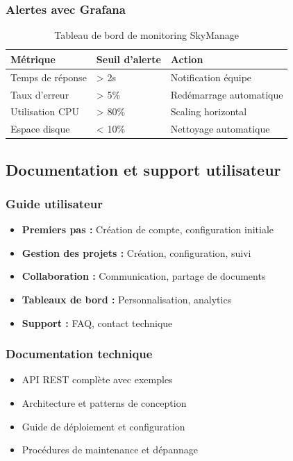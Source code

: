 \subsubsection{Alertes avec Grafana}
\begin{table}[h!]
\centering
\caption{Tableau de bord de monitoring SkyManage}
\label{tab:monitoring}
\begin{tabular}{|l|p{4cm}|p{4cm}|}
\hline
\textbf{Métrique} & \textbf{Seuil d'alerte} & \textbf{Action} \\
\hline
Temps de réponse & > 2s & Notification équipe \\
\hline
Taux d'erreur & > 5\% & Redémarrage automatique \\
\hline
Utilisation CPU & > 80\% & Scaling horizontal \\
\hline
Espace disque & < 10\% & Nettoyage automatique \\
\hline
\end{tabular}
\end{table}

\subsection{Documentation et support utilisateur}

\subsubsection{Guide utilisateur}
\begin{itemize}
    \item \textbf{Premiers pas :} Création de compte, configuration initiale
    \item \textbf{Gestion des projets :} Création, configuration, suivi
    \item \textbf{Collaboration :} Communication, partage de documents
    \item \textbf{Tableaux de bord :} Personnalisation, analytics
    \item \textbf{Support :} FAQ, contact technique
\end{itemize}

\subsubsection{Documentation technique}
\begin{itemize}
    \item API REST complète avec exemples
    \item Architecture et patterns de conception
    \item Guide de déploiement et configuration
    \item Procédures de maintenance et dépannage
\end{itemize}


